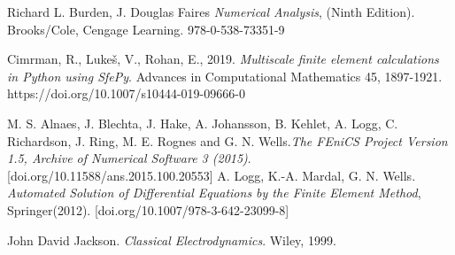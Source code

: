 \documentclass[a4paper]{article}
\begin{document}
\begin{thebibliography}{99}


 Richard L. Burden, J. Douglas Faires \textit{Numerical Analysis}, (Ninth Edition). Brooks/Cole, Cengage Learning. 978-0-538-73351-9

 Cimrman, R., Lukeš, V., Rohan, E., 2019. \textit{Multiscale finite element calculations in Python using SfePy}. Advances in Computational Mathematics 45, 1897-1921. https://doi.org/10.1007/s10444-019-09666-0

M. S. Alnaes, J. Blechta, J. Hake, A. Johansson, B. Kehlet, A. Logg, C. Richardson, J. Ring, M. E. Rognes and G. N. Wells.\textit{The FEniCS Project Version 1.5, Archive of Numerical Software 3 (2015)}. [doi.org/10.11588/ans.2015.100.20553]
\bibitem{}A. Logg, K.-A. Mardal, G. N. Wells. \textit{Automated Solution of Differential Equations by the Finite Element Method}, Springer(2012). [doi.org/10.1007/978-3-642-23099-8]


  John David Jackson. \textit{Classical Electrodynamics}. Wiley, 1999.





\end{thebibliography}
\end{document}
